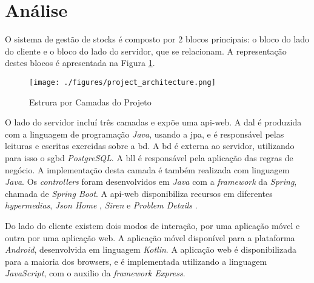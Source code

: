 %
%
\section{Análise}\label{sec32}

O sistema de gestão de stocks é composto por 2 blocos principais: o bloco do lado do cliente e o bloco do lado do servidor, que se relacionam. A representação destes blocos é apresentada na Figura \ref{project-layers-structure}. 

\begin{figure}[H]
	\centering
	\texttt{[image: ./figures/project\_architecture.png]}
	\caption{Estrura por Camadas do Projeto}
	\label{project-layers-structure}
\end{figure}

O lado do servidor incluí três camadas e expõe uma \gls{api-web}. A \acrfull{dal} é produzida com a linguagem de programação \textit{Java}, usando a \acrfull{jpa}, e é responsável pelas leituras e escritas exercidas sobre a \acrfull{bd}. A \acrshort{bd} é externa ao servidor, utilizando para isso o \acrfull{sgbd} \textit{PostgreSQL}. A \acrfull{bll} é responsável pela aplicação das regras de negócio. A implementação desta camada é também realizada com linguagem \textit{Java}. Os \textit{controllers} foram desenvolvidos em \textit{Java} com a \textit{framework} da \textit{Spring}, chamada de \textit{Spring Boot}. A \gls{api-web} disponibiliza recursos em diferentes \textit{hypermedias}, \textit{Json Home} \cite{draftnot72:jsonHome}, \textit{Siren} \cite{kevinswiber:siren} e \textit{Problem Details} \cite{RFC7807P89:problemDetails}.

Do lado do cliente existem dois modos de interação, por uma aplicação móvel e outra por uma aplicação web. A aplicação móvel disponível para a plataforma \textit{Android}, desenvolvida em linguagem \textit{Kotlin}. A aplicação web é disponibilizada para a maioria dos browsers, e é implementada utilizando a linguagem \textit{JavaScript}, com o auxilio da \textit{framework Express}.